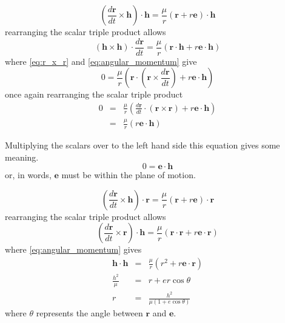 \begin{equation} 
\left(\frac{d\mathbf{r}}{dt}\times\mathbf{h}\right)\cdot\mathbf{h}=\frac{\mu}{r}\left(\mathbf{r}+r\mathbf{e}\right)\cdot\mathbf{h}
\end{equation}
rearranging the scalar triple product allows
\begin{equation}
\left(\mathbf{h}\times\mathbf{h}\right)\cdot\frac{d\mathbf{r}}{dt}=\frac{\mu}{r}\left(\mathbf{r}\cdot\mathbf{h}+r\mathbf{e}\cdot\mathbf{h}\right)
\end{equation}
where \eqref{eq:r_x_r} and \eqref{eq:angular_momentum} give
\begin{equation}
0=\frac{\mu}{r}\left(\mathbf{r}\cdot\left(\mathbf{r}\times\frac{d\mathbf{r}}{dt}\right)+r\mathbf{e}\cdot\mathbf{h}\right)
\end{equation}
once again rearranging the scalar triple product
\begin{eqnarray}
0 & = & \frac{\mu}{r}\left(\frac{d\mathbf{r}}{dt}\cdot\left(\mathbf{r}\times\mathbf{r}\right)+r\mathbf{e}\cdot\mathbf{h}\right)\\
 & = & \frac{\mu}{r}\left(r\mathbf{e}\cdot\mathbf{h}\right)
 \end{eqnarray}

Multiplying the scalars over to the left hand side this equation gives some meaning.
\begin{equation}
0=\mathbf{e}\cdot\mathbf{h}
\end{equation}
or, in words, $\mathbf{e}$ must be within the plane of motion.

\begin{equation}
\left(\frac{d\mathbf{r}}{dt}\times\mathbf{h}\right)\cdot\mathbf{r}=\frac{\mu}{r}\left(\mathbf{r}+r\mathbf{e}\right)\cdot\mathbf{r}
\end{equation}
rearranging the scalar triple product allows
\begin{equation}
\left(\frac{d\mathbf{r}}{dt}\times\mathbf{r}\right)\cdot\mathbf{h}=\frac{\mu}{r}\left(\mathbf{r}\cdot\mathbf{r}+r\mathbf{e}\cdot\mathbf{r}\right)
\end{equation}
where \eqref{eq:angular_momentum} gives 
\begin{eqnarray}
\mathbf{h}\cdot\mathbf{h} & = & \frac{\mu}{r}\left(r^{2}+r\mathbf{e}\cdot\mathbf{r}\right)\\
\frac{h^{2}}{\mu} & = & r+er\cos\theta\\
r & = & \frac{h^{2}}{\mu(1+e\cos\theta)}
\end{eqnarray}
where \(\theta\) represents the angle between \(\mathbf{r}\) and \(\mathbf{e}\).

